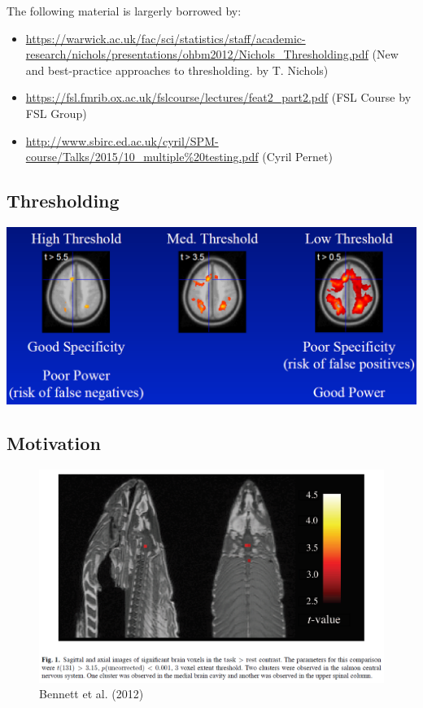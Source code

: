 \documentclass[]{article}
\providecommand{\tightlist}{%
  \setlength{\itemsep}{0pt}\setlength{\parskip}{0pt}}
\begin{document}
The following material is largerly borrowed by:

\begin{itemize}
\tightlist
\item
  \url{https://warwick.ac.uk/fac/sci/statistics/staff/academic-research/nichols/presentations/ohbm2012/Nichols_Thresholding.pdf}
  (New and best-practice approaches to thresholding. by T. Nichols)
\item
  \url{https://fsl.fmrib.ox.ac.uk/fslcourse/lectures/feat2_part2.pdf}
  (FSL Course by FSL Group)
\item
  \url{http://www.sbirc.ed.ac.uk/cyril/SPM-course/Talks/2015/10_multiple\%20testing.pdf}
  (Cyril Pernet)
\end{itemize}

\subsection{Thresholding}\label{thresholding}

\begin{center}\includegraphics[width=700px]{./figs/thresolding} \end{center}

\subsection{Motivation}\label{motivation}

\begin{figure}

{\centering \includegraphics[width=700px]{./figs/salmon} 

}

\caption{Bennett et al. (2012)}\label{fig:unnamed-chunk-2}
\end{figure}
\end{document}
